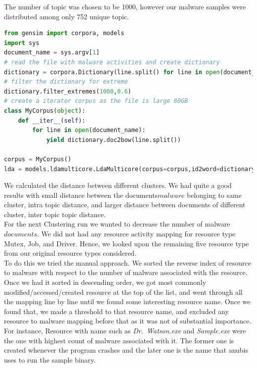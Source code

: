 The number of topic was chosen to be 1000, however our malware samples were distributed among only 752 unique topic.
\begin{lstlisting}[float,floatplacement=H,language=python,caption={Script to run Gensim LDA},label={lbl:lda.py}]
from gensim import corpora, models
import sys
document_name = sys.argv[1]
# read the file with malware activities and create dictionary
dictionary = corpora.Dictionary(line.split() for line in open(document_name))
# filter the dictionary for extreme
dictionary.filter_extremes(1000,0.6)
# create a iterator corpus as the file is large 80GB
class MyCorpus(object):
    def __iter__(self):
        for line in open(document_name):
            yield dictionary.doc2bow(line.split())

corpus = MyCorpus()
lda = models.ldamulticore.LdaMulticore(corpus=corpus,id2word=dictionary,num_topics=1000)
\end{lstlisting}
We calculated the distance between different clusters. We had quite a good results with small distance between the documents\(malware\) belonging to same cluster, intra topic distance, and larger distance between documents of different cluster, inter topic topic distance.
\\
For the next Clustering run we wanted to decrease the number of malware\(documents\).
We did not had any resource activity mapping for resource type Mutex, Job, and Driver. Hence, we looked upon the remaining five resource type from our original resource types considered.\\
To do this we tried the manual approach. We sorted the reverse index of resource to malware with respect to the number of malware associated with the resource.
Once we had it sorted in descending order, we got most commonly modified/accessed/created resource at the top of the list, and went through all the mapping line by line until we found some interesting resource name.
Once we found that, we made a threshold to that resource name, and excluded any resource to malware mapping before that as it was not of substantial importance.\\
For instance, Resource with name such as \emph{Dr.\ Watson.exe} and \emph{Sample.exe} were the one with highest count of malware associated with it. The former one is created whenever the program crashes and the later one is the name that anubis uses to run the sample binary.
